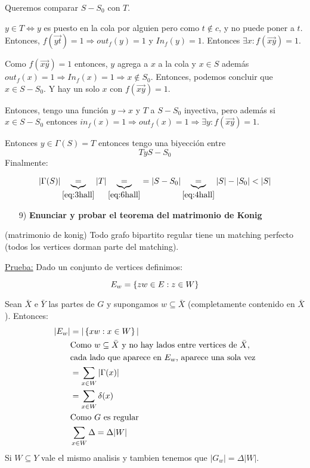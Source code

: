 \documentclass[12pt,a4paper]{article}
\begin{document}
Queremos comparar $S - S_{0}$ con $T$.
\medskip

$y\in T \Leftrightarrow y$ es puesto en la cola por alguien pero como $t\notin c$, 
y no puede poner a $t$. Entonces, $f(\overrightarrow{yt})=1 \Rightarrow out_{f}(y)=1$ 
y $In_{f}(y)=1$. Entonces $\exists x: f(\overrightarrow{xy})=1$.
\medskip

Como $f(\overrightarrow{xy})=1$ entonces, $y$ agrega a $x$ a la cola y $x\in S$ además 
$out_{f}(x) =1 \Rightarrow In_{f}(x)=1 \Rightarrow x \notin S_{0}$. Entonces, podemos 
concluir que $x\in S-S_{0}$. Y hay un solo $x$ con $f(\overrightarrow{xy})=1$.
\medskip

Entonces, tengo una función $y\to x$ y $T$ a $S-S_{0}$ inyectiva, pero además 
si $x\in S-S_{0}$ entonces $in_{f}(x)=1 \Rightarrow out_{f}(x)=1 \Rightarrow \exists y: f(\overrightarrow{xy})=1$.
\medskip

Entonces $y\in \Gamma(S) = T$ entonces tengo una biyección entre 
\begin{equation}
    T y S-S_{0}
    \label{eq:6hall}
\end{equation}
Finalmente:

\begin{equation}
    |\Gamma(S)| \underbrace{=}_{\ref{eq:3hall}} |T| \underbrace{=}_{\ref{eq:6hall}} = |S-S_{0}| \underbrace{=}_{\ref{eq:4hall}} |S| - |S_{0}| < |S|
\end{equation}

\begin{itemize}
    \item [9)] \textbf{Enunciar y probar el teorema del matrimonio de Konig}
    \label{dem:konig}
\end{itemize}

\begin{teorema} (matrimonio de konig) Todo grafo bipartito regular tiene un matching 
    perfecto (todos los vertices dorman parte del matching).
\end{teorema}

\underline{Prueba:} Dado un conjunto de vertices definimos:

$$E_{w} = \left\lbrace zw\in E: z\in W \right\rbrace$$

Sean $\bar{X}$ e $\bar{Y}$ las partes de $G$ y supongamos $w \subseteq \bar{X}$ 
(completamente contenido en $\bar{X}$). Entonces:
\begin{align*}
    |E_{w}| &= |\left\lbrace xw: x\in W \right\rbrace| \\
    &\text{Como $w \subseteq \bar{X}$ y no hay lados entre vertices de $\bar{X}$},\\ 
    &\text{cada lado que aparece en $E_{w}$, aparece una sola vez} \\
    &=\sum_{x\in W} |\Gamma(x)|\\
    &=\sum_{x\in W} \delta(x)\\
    &\text{Como $G$ es regular}\\
    &\sum_{x\in W} \Delta = \Delta |W|
\end{align*}
Si $W \subseteq Y$ vale el mismo analisis y tambien tenemos que $|G_{w}| = \Delta |W|$.
\medskip
\end{document}
